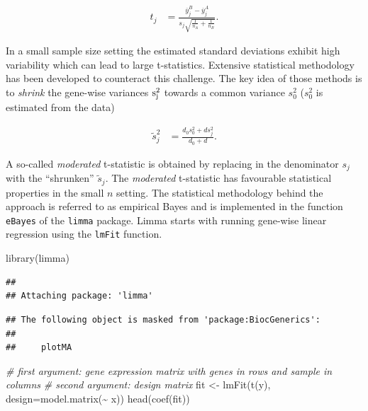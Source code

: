 \documentclass[
]{book}
\newenvironment{Shaded}{\begin{snugshade}}{\end{snugshade}}
\newcommand{\AttributeTok}[1]{\textcolor[rgb]{0.77,0.63,0.00}{#1}}
\newcommand{\CommentTok}[1]{\textcolor[rgb]{0.56,0.35,0.01}{\textit{#1}}}
\newcommand{\FunctionTok}[1]{\textcolor[rgb]{0.00,0.00,0.00}{#1}}
\newcommand{\NormalTok}[1]{#1}
\newcommand{\OtherTok}[1]{\textcolor[rgb]{0.56,0.35,0.01}{#1}}
\newcommand{\SpecialCharTok}[1]{\textcolor[rgb]{0.00,0.00,0.00}{#1}}
\begin{document}
\begin{align*}
t_{j}&=\frac{\overline{y}_{j}^B-\overline{y}_{j}^A}{s_{j}\sqrt{\frac{1}{n_A}+\frac{1}{n_B}}}.
\end{align*}

In a small sample size setting the estimated standard deviations exhibit high variability which can lead to large t-statistics. Extensive statistical methodology has been developed to counteract this challenge. The key idea of those methods is to \emph{shrink} the gene-wise variances \(\rm s^2_{j}\) towards a common variance \(s^2_0\) (\(s^2_0\) is estimated from the data)

\begin{align*}
\widetilde{s}_{j}^2&=\frac{d_0 s_0^2+d s^2_{j}}{d_0+d}.
\end{align*}

A so-called \emph{moderated} t-statistic is obtained by replacing in the denominator \(s_{j}\) with the ``shrunken'' \(\widetilde{s}_{j}\). The \emph{moderated} t-statistic has favourable statistical properties in the small \(n\) setting. The statistical methodology behind the approach is referred to as empirical Bayes and is implemented in the function \texttt{eBayes} of the \texttt{limma} package. Limma starts with running gene-wise linear regression using the \texttt{lmFit} function.

\begin{Shaded}
\begin{Highlighting}[]
\FunctionTok{library}\NormalTok{(limma)}
\end{Highlighting}
\end{Shaded}

\begin{verbatim}
## 
## Attaching package: 'limma'
\end{verbatim}

\begin{verbatim}
## The following object is masked from 'package:BiocGenerics':
## 
##     plotMA
\end{verbatim}

\begin{Shaded}
\begin{Highlighting}[]
\CommentTok{\# first argument: gene expression matrix with genes in rows and sample in columns}
\CommentTok{\# second argument: design matrix}
\NormalTok{fit }\OtherTok{\textless{}{-}} \FunctionTok{lmFit}\NormalTok{(}\FunctionTok{t}\NormalTok{(y), }\AttributeTok{design=}\FunctionTok{model.matrix}\NormalTok{(}\SpecialCharTok{\textasciitilde{}}\NormalTok{ x)) }
\FunctionTok{head}\NormalTok{(}\FunctionTok{coef}\NormalTok{(fit))}
\end{Highlighting}
\end{Shaded}
\end{document}
